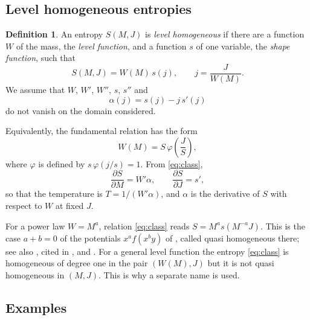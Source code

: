 \documentclass[11pt]{article}
\theoremstyle{definition}
\newtheorem{definition}{Definition}
\theoremstyle{remark}
\begin{document}
\subsection{Level homogeneous entropies}

\begin{definition}\label{def:lh}
An entropy $S(M,J)$ is \emph{level homogeneous} if there are a function $W$ of the mass, the \emph{level function}, and a function $s$ of one variable, the \emph{shape function}, such that
\begin{equation}\label{eq:class}
S(M,J)=W(M)\,s(j),\qquad j=\frac{J}{W(M)} .
\end{equation}
We assume that $W$, $W'$, $W''$, $s$, $s''$ and
\begin{equation}\label{eq:alpha}
\alpha(j)=s(j)-j\,s'(j)
\end{equation}
do not vanish on the domain considered.
\end{definition}

Equivalently, the fundamental relation has the form
\begin{equation}\label{eq:phi}
W(M)=S\,\varphi\!\left(\frac{J}{S}\right),
\end{equation}
where $\varphi$ is defined by $s\,\varphi(j/s)=1$. From \eqref{eq:class},
\begin{equation}\label{eq:first}
\frac{\partial S}{\partial M}=W'\alpha,\qquad \frac{\partial S}{\partial J}=s' ,
\end{equation}
so that the temperature is $T=1/(W'\alpha)$, and $\alpha$ is the derivative of $S$ with respect to $W$ at fixed $J$.

For a power law $W=M^{a}$, relation \eqref{eq:class} reads $S=M^{a}s(M^{-a}J)$. This is the case $a+b=0$ of the potentials $x^{a}f(x^{b}y)$ of \cite{ABP06}, called quasi homogeneous there; see also \cite{HS}, cited in \cite{ABP06}, and \cite{Que}. For a general level function the entropy \eqref{eq:class} is homogeneous of degree one in the pair $(W(M),J)$ but it is not quasi homogeneous in $(M,J)$. This is why a separate name is used.

\subsection{Examples}\label{sec:examples}
\end{document}
